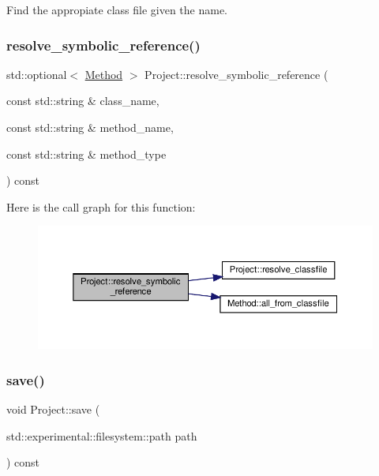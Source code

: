 Find the appropiate class file given the name. 

\mbox{\label{classProject_a2bf65efcb1e91bfe76d2faab76127c11}} 
\subsubsection{\texorpdfstring{resolve\+\_\+symbolic\+\_\+reference()}{resolve\_symbolic\_reference()}}
{\footnotesize\ttfamily std\+::optional$<$ \hyperlink{classMethod}{Method} $>$ Project\+::resolve\+\_\+symbolic\+\_\+reference (\begin{DoxyParamCaption}\item[{const std\+::string \&}]{class\+\_\+name,  }\item[{const std\+::string \&}]{method\+\_\+name,  }\item[{const std\+::string \&}]{method\+\_\+type }\end{DoxyParamCaption}) const}

Here is the call graph for this function\+:
\nopagebreak
\begin{figure}[H]
\begin{center}
\leavevmode
\includegraphics[width=350pt]{classProject_a2bf65efcb1e91bfe76d2faab76127c11_cgraph}
\end{center}
\end{figure}
\mbox{\label{classProject_aff5e62e0e0e3e8c7123a7dd6ae51cb3f}} 
\subsubsection{\texorpdfstring{save()}{save()}}
{\footnotesize\ttfamily void Project\+::save (\begin{DoxyParamCaption}\item[{std\+::experimental\+::filesystem\+::path}]{path }\end{DoxyParamCaption}) const}



